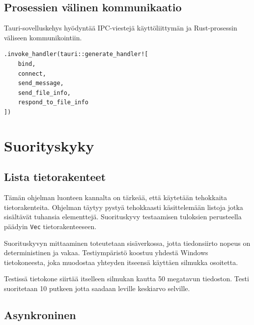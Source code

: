 \documentclass[a4paper,12pt]{article}
\begin{document}
    \subsection{Prosessien välinen kommunikaatio}
    Tauri-sovelluskehys hyödyntää IPC-viestejä käyttöliittymän ja Rust-prosessin väliseen kommunikointiin.

    \begin{lstlisting}[caption={IPC-komentojen määritys}, label={lst:ipc_commands}]
.invoke_handler(tauri::generate_handler![
    bind,
    connect,
    send_message,
    send_file_info,
    respond_to_file_info
])\end{lstlisting}

    
    \section{Suorityskyky}\label{sec:suorityskyky}

    \subsection{Lista tietorakenteet}
    Tämän ohjelman luonteen kannalta on tärkeää, että käytetään tehokkaita tietorakenteita. Ohjelman täytyy pystyä tehokkaasti käsittelemään listoja jotka sisältävät tuhansia elementtejä. Suorituskyvy testaamisen tuloksien perusteella päädyin \lstinline{Vec} tietorakenteeseen.

    
    Suorituskyvyn mittaaminen toteutetaan sisäverkossa, jotta tiedonsiirto nopeus on deterministinen ja vakaa.
    Testiympäristö koostuu yhdestä Windows tietokoneesta, joka muodostaa yhteyden itseensä käyttäen silmukka osoitetta.\par
    Testissä tietokone siirtää itselleen silmukan kautta 50 megatavun tiedoston. Testi suoritetaan 10 putkeen jotta saadaan leville keskiarvo selville.

    \subsection{Asynkroninen}


    \newpage
    \printbibliography
\end{document}
